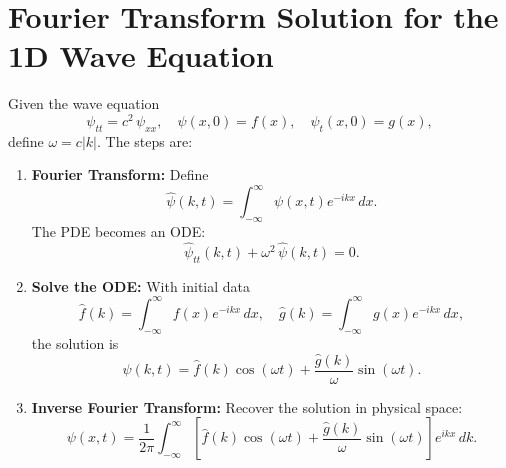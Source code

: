 \documentclass[10pt]{article}
\begin{document}
\section*{Fourier Transform Solution for the 1D Wave Equation}
Given the wave equation
\[
\psi_{tt} = c^2\, \psi_{xx}, \quad \psi(x,0)=f(x), \quad \psi_t(x,0)=g(x),
\]
define \(\omega = c|k|\). The steps are:

\begin{enumerate}
  \item \textbf{Fourier Transform:} Define
    \[
    \hat{\psi}(k,t)=\int_{-\infty}^\infty \psi(x,t)e^{-ikx}\,dx.
    \]
    The PDE becomes an ODE:
    \[
    \hat{\psi}_{tt}(k,t) + \omega^2\,\hat{\psi}(k,t)=0.
    \]
  \item \textbf{Solve the ODE:} With initial data
    \[
    \hat{f}(k)=\int_{-\infty}^\infty f(x)e^{-ikx}\,dx, \quad \hat{g}(k)=\int_{-\infty}^\infty g(x)e^{-ikx}\,dx,
    \]
    the solution is
    \[
    \hat{\psi}(k,t)=\hat{f}(k)\cos(\omega t)+\frac{\hat{g}(k)}{\omega}\sin(\omega t).
    \]
  \item \textbf{Inverse Fourier Transform:} Recover the solution in physical space:
    \[
    \psi(x,t)=\frac{1}{2\pi}\int_{-\infty}^{\infty}\left[\hat{f}(k)\cos(\omega t)+\frac{\hat{g}(k)}{\omega}\sin(\omega t)\right]e^{ikx}\,dk.
    \]
\end{enumerate}
\end{document}
